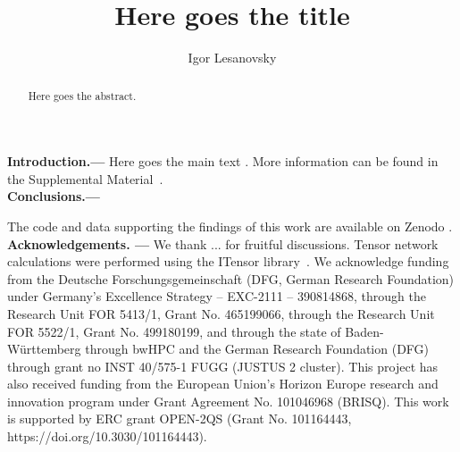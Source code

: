 \documentclass[reprint,twocolumn,showpacs,superscriptaddress,longbibliography,email,floatfix,aps,prl]{revtex4-2}
\begin{document}
\title{Here goes the title}
\author{Igor Lesanovsky}

\begin{abstract}
    Here goes the abstract.
\end{abstract}

\maketitle


\textbf{Introduction.--- } Here goes the main text \cite{Garrahan2010}. More information can be found in the Supplemental Material~\cite{SM}. \\


\textbf{Conclusions.---} 


The code and data supporting the findings of this work are available on Zenodo \cite{ZenodoData}. \\


\acknowledgments
\textbf{Acknowledgements. --- } We thank ... for fruitful discussions. Tensor network calculations were performed using the ITensor library~\cite{Fishman2022}. We acknowledge funding from the Deutsche Forschungsgemeinschaft (DFG, German Research Foundation) under Germany's Excellence Strategy -- EXC-2111 -- 390814868, through the Research Unit FOR 5413/1, Grant No. 465199066, through the Research Unit FOR 5522/1, Grant No. 499180199, and through the state of Baden-W\"urttemberg through bwHPC and the German Research Foundation (DFG) through grant no INST 40/575-1 FUGG (JUSTUS 2 cluster). This project has also received funding from the European Union’s Horizon Europe research and innovation program under Grant Agreement No. 101046968 (BRISQ). This work is supported by ERC grant OPEN-2QS (Grant No. 101164443, https://doi.org/10.3030/101164443).
\end{document}
